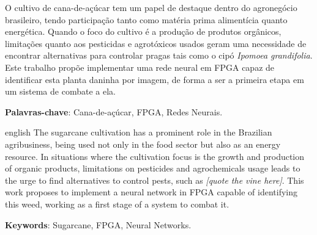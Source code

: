 \documentclass[
	12pt,				%
	oneside,			%
	a4paper,			%
	english,			%
	french,				%
	spanish,			%
	brazil,				%
	]{abntex2}
\begin{document}

\frenchspacing


\imprimircapa

\imprimirfolhaderosto



\setlength{\absparsep}{18pt} %
\begin{resumo}
 O cultivo de cana-de-açúcar tem um papel de destaque dentro do agronegócio brasileiro, tendo participação tanto como matéria prima alimentícia quanto energética. Quando o foco do cultivo é a produção de produtos orgânicos, limitações quanto aos pesticidas e agrotóxicos usados geram uma necessidade de encontrar alternativas para controlar pragas tais como o cipó \textit{Ipomoea grandifolia}. Este trabalho propõe implementar uma rede neural em FPGA capaz de identificar esta planta daninha por imagem, de forma a ser a primeira etapa em um sistema de combate a ela.

 \textbf{Palavras-chave}: Cana-de-açúcar, FPGA, Redes Neurais.
\end{resumo}

\begin{resumo}[Abstract]
 \begin{otherlanguage*}{english} %
  The sugarcane cultivation has a prominent role in the Brazilian agribusiness, being used not only in the food sector but also as an energy resource. In situations where the cultivation focus is the growth and production of organic products, limitations on pesticides and agrochemicals usage leads to the urge to find alternatives to control pests, such as \textit{[quote the vine here]}. This work proposes to implement a neural network in FPGA capable of identifying this weed, working as a first stage of a system to combat it.

   \vspace{\onelineskip}
 
   \noindent 
   \textbf{Keywords}: Sugarcane, FPGA, Neural Networks.
 \end{otherlanguage*}
\end{resumo}
\end{document}
